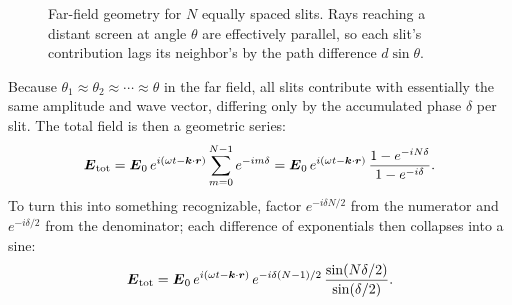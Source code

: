 \begin{figure}[ht]
    \centering
    \caption{Far-field geometry for $N$ equally spaced slits. Rays reaching a distant screen at angle $\theta$ are effectively parallel, so each slit's contribution lags its neighbor's by the path difference $d\sin\theta$.}
    \label{fig:multislit-geometry}
\end{figure}

Because $\theta_1\approx\theta_2\approx\cdots\approx\theta$ in the far field, all slits contribute with essentially the same amplitude and wave vector, differing only by the accumulated phase $\delta$ per slit. The total field is then a geometric series:
\begin{equation}
    \vect{E}_{\text{tot}} = \vect{E}_0\, e^{i(\omega t - \lvect{k}\cdot\lvect{r})} \sum_{m=0}^{N-1} e^{-i m \delta}
    = \vect{E}_0\, e^{i(\omega t - \lvect{k}\cdot\lvect{r})}\, \frac{1 - e^{-i N \delta}}{1 - e^{-i \delta}}.
\end{equation}
To turn this into something recognizable, factor $e^{-i\delta N/2}$ from the numerator and $e^{-i\delta/2}$ from the denominator; each difference of exponentials then collapses into a sine:
\begin{equation}
    \vect{E}_{\text{tot}} = \vect{E}_0\, e^{i(\omega t - \lvect{k}\cdot\lvect{r})}\, e^{-i \delta (N-1)/2}\, \frac{\sin(N\delta/2)}{\sin(\delta/2)}.
\end{equation}

